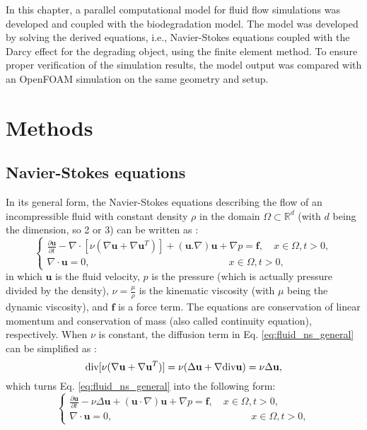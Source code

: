 In this chapter, a parallel computational model for fluid flow simulations was developed and coupled with the biodegradation model. The model was developed by solving the derived equations, i.e., Navier-Stokes equations coupled with the Darcy effect for the degrading object, using the finite element method. To ensure proper verification of the simulation results, the model output was compared with an OpenFOAM simulation on the same geometry and setup.

\section{Methods}

\subsection{Navier-Stokes equations}

In its general form, the Navier-Stokes equations describing the flow of an incompressible fluid with constant density $\rho$ in the domain $\Omega \subset \mathbb{R}^{d}$ (with $d$ being the dimension, so 2 or 3) can be written as \cite{Chung2014}:
\begin{equation} \label{eq:fluid_ns_general}
\left\{ {\begin{array}{*{20}{l}}
\displaystyle  {\frac{{\partial {\mathbf{u}}}}{{\partial t}} - {\nabla\cdot}[\nu(\nabla {\mathbf{u}} + \nabla {{\mathbf{u}}^T})] + ({\mathbf{u}}.\nabla ){\mathbf{u}} + \nabla p = {\mathbf{f}},\quad x \in \Omega ,t > 0,} \\
\displaystyle  {\nabla\cdot{\mathbf{u}} = 0,\quad \quad \quad \quad \quad \quad \quad \quad \quad \quad \quad \quad \quad \quad x \in \Omega ,t > 0,}
\end{array}} \right.
\end{equation}
in which $\mathbf{u}$ is the fluid velocity, $p$ is the pressure (which is actually pressure divided by the density), $\nu = \frac{\mu}{\rho}$ is the kinematic viscosity (with $\mu$ being the dynamic viscosity), and
$\mathbf{f}$ is a force term. The equations are conservation of linear momentum and conservation of mass (also called continuity equation), respectively. When $\nu$ is constant, the diffusion term in Eq. \ref{eq:fluid_ns_general} can be simplified as \cite{Quarteroni2014}:
\begin{equation}
\text{div} [\nu(\nabla {\bf u}+\nabla {\bf u}^{T})] =\nu (\Delta {\bf u} + \nabla \text{div} {\bf u})=\nu \Delta {\bf u},
\end{equation}
which turns Eq. \ref{eq:fluid_ns_general} into the following form:
\begin{equation}  \label{eq:fluid_ns}
\left\{ {\begin{array}{*{20}{l}}
\displaystyle  {\frac{{\partial {\mathbf{u}}}}{{\partial t}} - \nu\Delta{\mathbf{u}} + \left( {{\mathbf{u}} \cdot \nabla } \right) {\mathbf{u}} + \nabla p = {\mathbf{f}},\quad x \in \Omega ,t > 0,} \\
 \displaystyle {\nabla\cdot{\mathbf{u}} = 0,\quad \quad \quad \quad \quad \quad \quad \quad \quad \quad \quad \quad \quad \quad x \in \Omega ,t > 0,}
\end{array}} \right.
\end{equation}

